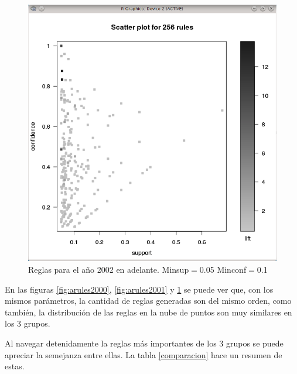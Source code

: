 \documentclass[journal]{IEEEtran}
\begin{document}
\begin{figure}[ht!]
  \caption{Reglas para el año 2001. Minsup$=$0.05 Minconf$=$0.1}\label{fig:arules2001}
\endminipage\hfill
{}%
  \includegraphics[width=\linewidth]{2002.png}
  \caption{Reglas para el año 2002 en adelante. Minsup$=$0.05 Minconf$=$0.1}\label{fig:arules2002}
\endminipage
\end{figure}

En las figuras \ref{fig:arules2000}, \ref{fig:arules2001} y \ref{fig:arules2002} 
se puede ver que, con los mismos parámetros, la cantidad de reglas
generadas son del mismo orden, como también, la distribución de las reglas
en la nube de puntos son muy similares en los 3 grupos.

Al navegar detenidamente la reglas más importantes de los 3 grupos 
se puede apreciar la semejanza
entre ellas. La tabla \ref{comparacion} hace un resumen de estas.
\end{document}
